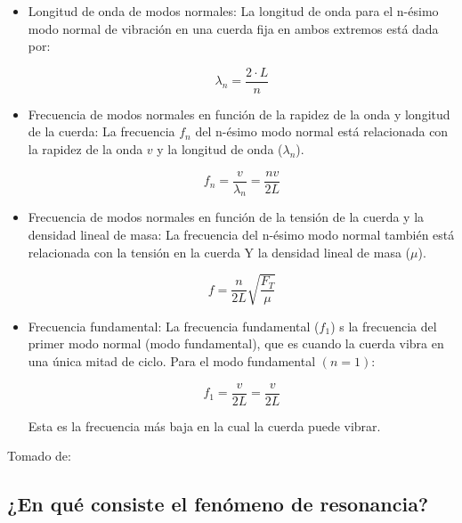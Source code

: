 \documentclass[twocolumn, 12pt]{article}
\begin{document}
\begin{itemize}[label=$\triangleright$]
    \item Longitud de onda de modos normales: La longitud de onda
          para el n-ésimo modo normal de vibración en una cuerda fija
          en ambos extremos está dada por:

          \begin{equation*}
              \lambda_{n} = \frac{2 \cdot L}{n}
          \end{equation*}

    \item Frecuencia de modos normales en función de la rapidez de la
          onda y longitud de la cuerda: La frecuencia $f_n$ del
          n-ésimo modo normal está relacionada con la rapidez de la
          onda $v$ y la longitud de onda ($\lambda_{n}$).

          \begin{equation*}
              f_n = \frac{v}{\lambda_{n}} = \frac{n v}{2L}
          \end{equation*}

    \item Frecuencia de modos normales en función de la tensión de la
          cuerda y la densidad lineal de masa: La frecuencia del
          n-ésimo modo normal también está relacionada con la tensión
          en la cuerda Y la densidad lineal de masa ($\mu$).

          \begin{equation*}
              f = \frac{n}{2 L} \sqrt{\frac{F_T}{\mu}}
          \end{equation*}

    \item Frecuencia fundamental: La frecuencia fundamental ($f_{1}$)
          s la frecuencia del primer modo normal (modo fundamental),
          que es cuando la cuerda vibra en una única mitad de ciclo.
          Para el modo fundamental $(n=1)$:

          \begin{equation*}
              f_{1} = \frac{v}{2L} = \frac{v}{2L}
          \end{equation*}

          Esta es la frecuencia más baja en la cual la cuerda puede
          vibrar.
\end{itemize}

Tomado de:~\cite{Fernándezc}

\subsection{¿En qué consiste el fenómeno de resonancia?}
\end{document}
